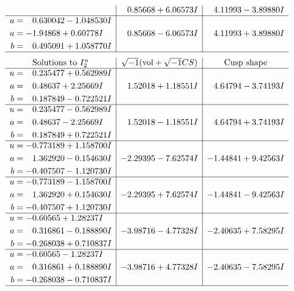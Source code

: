 \documentclass[1p]{elsarticle_modified}
\theoremstyle{definition}
\newcommand{\I}{\sqrt{-1}}
\begin{document}
$$\begin{array}{c|c|c}
 & \phantom{-}0.85668 + 6.06573 I & \phantom{-}4.11993 - 3.89880 I \\ \hline\begin{aligned}
u &= \phantom{-}0.630042 - 1.048530 I \\
a &= -1.94868 + 0.60778 I \\
b &= \phantom{-}0.495091 + 1.058770 I\end{aligned}
 & \phantom{-}0.85668 - 6.06573 I & \phantom{-}4.11993 + 3.89880 I\\
 \hline 
 \end{array}$$\newpage$$\begin{array}{c|c|c}  
\text{Solutions to }I^u_{2}& \I (\text{vol} + \sqrt{-1}CS) & \text{Cusp shape}\\
 \hline 
\begin{aligned}
u &= \phantom{-}0.235477 + 0.562989 I \\
a &= \phantom{-}0.48637 + 2.25669 I \\
b &= \phantom{-}0.187849 - 0.722521 I\end{aligned}
 & \phantom{-}1.52018 + 1.18551 I & \phantom{-}4.64794 - 3.74193 I \\ \hline\begin{aligned}
u &= \phantom{-}0.235477 - 0.562989 I \\
a &= \phantom{-}0.48637 - 2.25669 I \\
b &= \phantom{-}0.187849 + 0.722521 I\end{aligned}
 & \phantom{-}1.52018 - 1.18551 I & \phantom{-}4.64794 + 3.74193 I \\ \hline\begin{aligned}
u &= -0.773189 + 1.158700 I \\
a &= \phantom{-}1.362920 - 0.154630 I \\
b &= -0.407507 - 1.120730 I\end{aligned}
 & -2.29395 - 7.62574 I & -1.44841 + 9.42563 I \\ \hline\begin{aligned}
u &= -0.773189 - 1.158700 I \\
a &= \phantom{-}1.362920 + 0.154630 I \\
b &= -0.407507 + 1.120730 I\end{aligned}
 & -2.29395 + 7.62574 I & -1.44841 - 9.42563 I \\ \hline\begin{aligned}
u &= -0.60565 + 1.28237 I \\
a &= \phantom{-}0.316861 - 0.188890 I \\
b &= -0.268038 + 0.710837 I\end{aligned}
 & -3.98716 - 4.77328 I & -2.40635 + 7.58295 I \\ \hline\begin{aligned}
u &= -0.60565 - 1.28237 I \\
a &= \phantom{-}0.316861 + 0.188890 I \\
b &= -0.268038 - 0.710837 I\end{aligned}
 & -3.98716 + 4.77328 I & -2.40635 - 7.58295 I\\
 \hline 
 \end{array}$$\newpage
\end{document}
